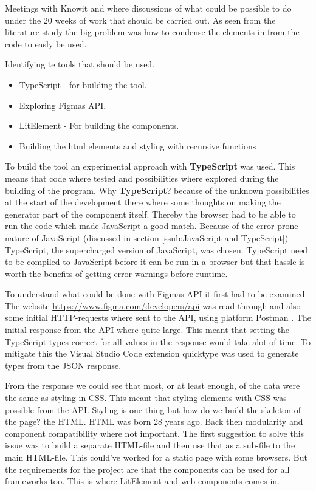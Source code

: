 Meetings with Knowit and where discussions of what could be possible to do under the 20 weeks of work that should be carried out. As seen from the literature study the big problem was how to condense the elements in from the code to easly be used. 

Identifying te tools that should be used.
\begin{itemize}
  \item TypeScript - for building the tool.
  \item Exploring Figmas API.
  \item LitElement - For building the components. 
  \item Building the html elements and styling with recursive functions
\end{itemize}

To build the tool an experimental approach with \textbf{TypeScript} was used. This means that code where tested and possibilities where explored during the building of the program. Why \textbf{TypeScript}? because of the unknown possibilities at the start of the development there where some thoughts on making the generator part of the component itself. Thereby the browser had to be able to run the code which made JavaScript a good match. Because of the error prone nature of JavaScript (discussed in section \ref{ssub:JavaScript and TypeScript}) TypeScript, the supercharged version of JavaScript, was chosen. TypeScript need to be compiled to JavaScript before it can be run in a browser but that hassle is worth the benefits of getting error warnings before runtime.

To understand what could be done with Figmas API it first had to be examined. The website \url{https://www.figma.com/developers/api} was read through and also some initial HTTP-requests where sent to the API, using platform Postman \cite{PostmanCollaborationPlatform}. The initial response from the API where quite large. This meant that setting the TypeScript types correct for all values in the response would take alot of time. To mitigate this the Visual Studio Code \cite{VisualStudioCode} extension quicktype\cite{ConvertJSONSwift} was used to generate types from the JSON response. 

From the response we could see that most, or at least enough, of the data were the same as styling in CSS. This meant that styling elements with CSS was possible from the API. Styling is one thing but how do we build the skeleton of the page? the HTML. HTML was born 28 years ago. Back then modularity and component compatibility where not important. The first suggestion to solve this issue was to build a separate HTML-file and then use that as a sub-file to the main HTML-file. This could've worked for a static page with some browsers. But the requirements for the project are that the components can be used for all frameworks too. This is where LitElement and web-components comes in. 

